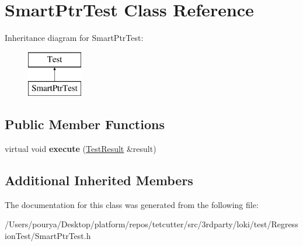 \hypertarget{classSmartPtrTest}{}\section{Smart\+Ptr\+Test Class Reference}
\label{classSmartPtrTest}
Inheritance diagram for Smart\+Ptr\+Test\+:\begin{figure}[H]
\begin{center}
\leavevmode
\includegraphics[height=2.000000cm]{classSmartPtrTest}
\end{center}
\end{figure}
\subsection*{Public Member Functions}
\begin{DoxyCompactItemize}
\item 
\hypertarget{classSmartPtrTest_a84fe573dfe7c4d3ff5835da6d37fefec}{}virtual void {\bfseries execute} (\hyperlink{classTestResult}{Test\+Result} \&result)\label{classSmartPtrTest_a84fe573dfe7c4d3ff5835da6d37fefec}

\end{DoxyCompactItemize}
\subsection*{Additional Inherited Members}


The documentation for this class was generated from the following file\+:\begin{DoxyCompactItemize}
\item 
/\+Users/pourya/\+Desktop/platform/repos/tetcutter/src/3rdparty/loki/test/\+Regression\+Test/Smart\+Ptr\+Test.\+h\end{DoxyCompactItemize}
